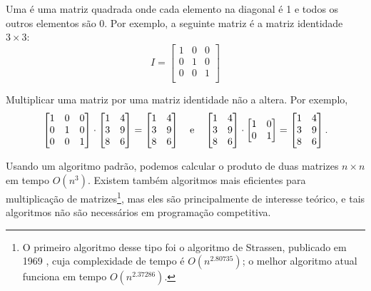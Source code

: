 
Uma  é uma matriz quadrada
onde cada elemento na diagonal é 1
e todos os outros elementos são 0.
Por exemplo, a seguinte matriz
é a matriz identidade $3 \times 3$:
\[
 I = \begin{bmatrix}
  1 & 0 & 0 \\
  0 & 1 & 0 \\
  0 & 0 & 1 \\
 \end{bmatrix}
\]

\begin{samepage}
Multiplicar uma matriz por uma matriz identidade
não a altera. Por exemplo,
\[
 \begin{bmatrix}
  1 & 0 & 0 \\
  0 & 1 & 0 \\
  0 & 0 & 1 \\
 \end{bmatrix}
\cdot
 \begin{bmatrix}
  1 & 4 \\
  3 & 9 \\
  8 & 6 \\
 \end{bmatrix}
=
 \begin{bmatrix}
  1 & 4 \\
  3 & 9 \\
  8 & 6 \\
 \end{bmatrix} \hspace{10px} \textrm{e} \hspace{10px}
 \begin{bmatrix}
  1 & 4 \\
  3 & 9 \\
  8 & 6 \\
 \end{bmatrix}
\cdot
 \begin{bmatrix}
  1 & 0 \\
  0 & 1 \\
 \end{bmatrix}
=
 \begin{bmatrix}
  1 & 4 \\
  3 & 9 \\
  8 & 6 \\
 \end{bmatrix}.
\]
\end{samepage}

Usando um algoritmo padrão,
podemos calcular o produto de
duas matrizes $n \times n$
em tempo $O(n^3)$.
Existem também algoritmos mais eficientes
para multiplicação de matrizes\footnote{O primeiro algoritmo desse tipo
foi o algoritmo de Strassen,
publicado em 1969 \cite{str69},
cuja complexidade de tempo é $O(n^{2.80735})$;
o melhor algoritmo atual \cite{gal14}
funciona em tempo $O(n^{2.37286})$.},
mas eles são principalmente de interesse teórico,
e tais algoritmos não são necessários
em programação competitiva.


